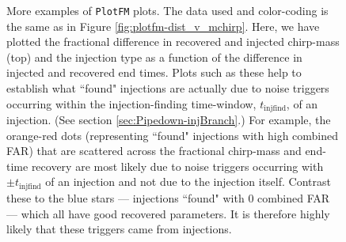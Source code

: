 \begin{figure}[p]
\center
{}
\caption{
More examples of \texttt{PlotFM} plots. The data used and color-coding is the
same as in Figure \ref{fig:plotfm-dist_v_mchirp}. Here, we have plotted the
fractional difference in recovered and injected chirp-mass (top) and the
injection type as a function of the difference in injected and recovered end
times. Plots such as these help to establish what ``found" injections are
actually due to noise triggers occurring within the injection-finding
time-window, $t_{\mathrm{injfind}}$, of an injection. (See section
\ref{sec:Pipedown-injBranch}.) For example, the orange-red dots (representing
``found" injections with high combined FAR) that are scattered across the
fractional chirp-mass and end-time recovery are most likely due to noise
triggers occurring with $\pm t_{\mathrm{injfind}}$ of an injection and not due
to the injection itself. Contrast these to the blue stars --- injections
``found" with 0 combined FAR --- which all have good recovered parameters. It
is therefore highly likely that these triggers came from injections.}
\label{fig:plotfm-example_v_dt}
\end{figure}

